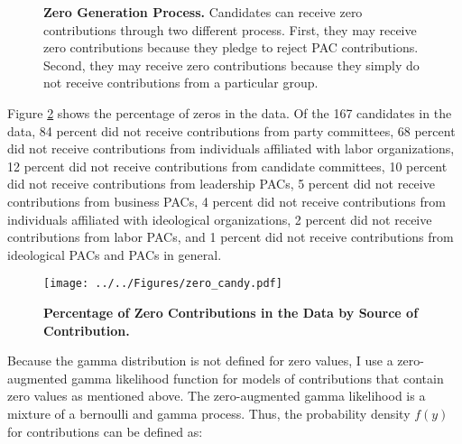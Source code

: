 \documentclass[12pt]{article}
\begin{document}
\begin{figure}[!htb]
    \centering
    \caption{\textbf{Zero Generation Process.} Candidates can receive zero contributions through two different process. First, they may receive zero contributions because they pledge to reject PAC contributions. Second, they may receive zero contributions because they simply do not receive contributions from a particular group.}
    \label{fig: zeros}
\end{figure}

Figure \ref{fig: zeros} shows the percentage of zeros in the data. Of the 167 candidates in the data, 84 percent did not receive contributions from party committees, 68 percent did not receive contributions from individuals affiliated with labor organizations, 12 percent did not receive contributions from candidate committees, 10 percent did not receive contributions from leadership PACs, 5 percent did not receive contributions from business PACs,  4 percent did not receive contributions from individuals affiliated with ideological organizations, 2 percent did not receive contributions from labor PACs, and 1 percent did not receive contributions from ideological PACs and PACs in general.  

\begin{figure}[!htb]
    \centering
    \texttt{[image: ../../Figures/zero\_candy.pdf]}
    \caption{\textbf{Percentage of Zero Contributions in the Data by Source of Contribution.}}
    \label{fig: zeros}
\end{figure}

Because the gamma distribution is not defined for zero values, I use a zero-augmented gamma likelihood function for models of contributions that contain zero values as mentioned above. The zero-augmented gamma likelihood is a mixture of a bernoulli and gamma process. Thus, the probability density $f(y)$ for contributions can be defined as:    
\end{document}
